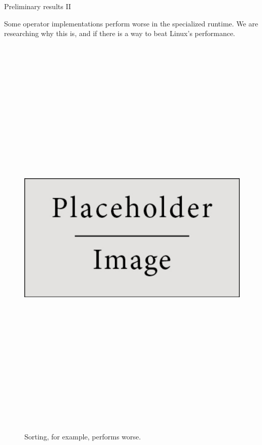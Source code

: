 \begin{block}{Preliminary results II}

  Some operator implementations perform worse in the specialized runtime. We are researching why this is, and if there is a way to beat Linux's performance.
  
  \begin{figure}
    \includegraphics[height=20cm]{place_holder.png}
    \caption{Sorting, for example, performs worse.}
  \end{figure}

\end{block}
